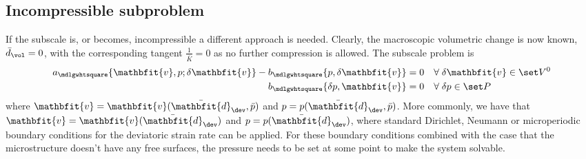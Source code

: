 \documentclass[a4paper,11pt]{article}
\renewcommand{\ta}[1]{\mathbfit{#1}}
\renewcommand{\ts}[1]{\mathbfit{#1}}
\renewcommand{\Box}{\mdlgwhtsquare}
\begin{document}
\subsection{Incompressible subproblem} \label{sec:nested_incompressible}
If the subscale is, or becomes, incompressible a different approach is needed.
Clearly, the macroscopic volumetric change is now known, $\bar{d}_\vol = 0$, with the corresponding tangent $\frac{1}{\bar{K}} = 0$ as no further compression is allowed.
The subscale problem is
\begin{align}
 a_\Box\{\ta v, p; \delta\ta v\} - b_\Box\{p,\delta\ta v\} &= 0\quad \forall\;\delta\ta v \in \set V^0 \\
 b_\Box\{\delta p, \ta v\} &= 0\quad \forall\;\delta p \in \set P
\end{align}
where $\ta v = \ta v(\bar{\ts d}_\dev, \bar p)$ and $p = p(\bar{\ts d}_\dev, \bar p)$. More commonly, we have that 
$\ta v = \ta v(\bar{\ts d}_\dev)$ and $p = p(\bar{\ts d}_\dev)$, 
where standard Dirichlet, Neumann  or microperiodic boundary conditions for the deviatoric strain rate can be applied.
For these boundary conditions combined with the case that the microstructure doesn't have any free surfaces, 
the pressure needs to be set at some point to make the system solvable.
\end{document}
